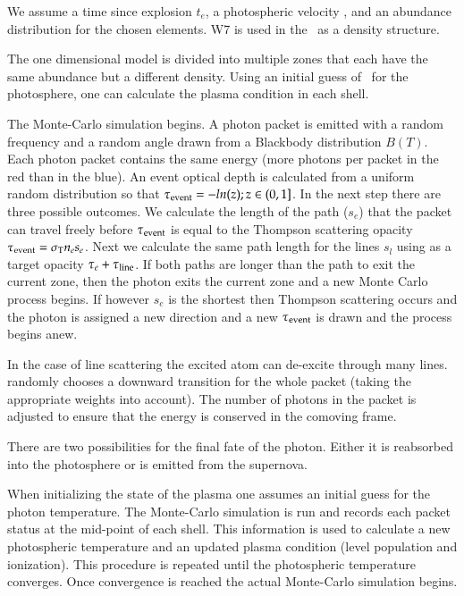 We assume a time since explosion $t_e$, a photospheric velocity \vph, \lbol and an abundance distribution for the chosen elements. W7 \citep{1984ApJ...286..644N} is used in the \mlc\ as a density structure.

The one dimensional model is divided into multiple zones that each have the same abundance but a different density. 
Using an initial guess of \teff\ for the photosphere, one can calculate the plasma condition in each shell. 

The Monte-Carlo simulation begins. A photon packet is emitted with a random frequency and a random angle drawn from a Blackbody distribution $B(T)$. Each photon packet contains the same energy (more photons per packet in the red than in the blue). 
An event optical depth is calculated from a uniform random distribution so that $\tau_{\rm event}=-ln(z); z \in (0,1]$.  
In the next step there are three possible outcomes. We calculate the length of the path ($s_e$) that the packet can travel freely before $\tau_{\rm event}$ is equal to the Thompson scattering opacity $\tau_{\rm event} = \sigma_{\rm T} n_e s_e$. Next we calculate the same path length for the lines $s_l$ using as a target opacity $\tau_e + \tau_{\rm line}$. 
If both paths are longer than the path to exit the current zone, then the photon exits the current zone and a new Monte Carlo process begins. 
If however $s_e$ is the shortest then Thompson scattering occurs and the photon is assigned a new direction and a new $\tau_{\rm event}$ is drawn and the process begins anew.

In the case of line scattering the excited atom can de-excite through many lines. \mlc randomly chooses a downward transition for the whole packet (taking the appropriate weights into account). The number of photons in the packet is adjusted to ensure that the energy is conserved in the comoving frame. 

There are two possibilities for the final fate of the photon. Either it is reabsorbed into the photosphere or is emitted from the supernova. 

When initializing the state of the plasma one assumes an initial guess for the photon temperature. The Monte-Carlo simulation is run and records each packet status at the mid-point of each shell. This information is used to calculate a new photospheric temperature and an updated plasma condition (level population and ionization). 
This procedure is repeated until the photospheric temperature converges. Once convergence is reached the actual Monte-Carlo simulation begins. 


